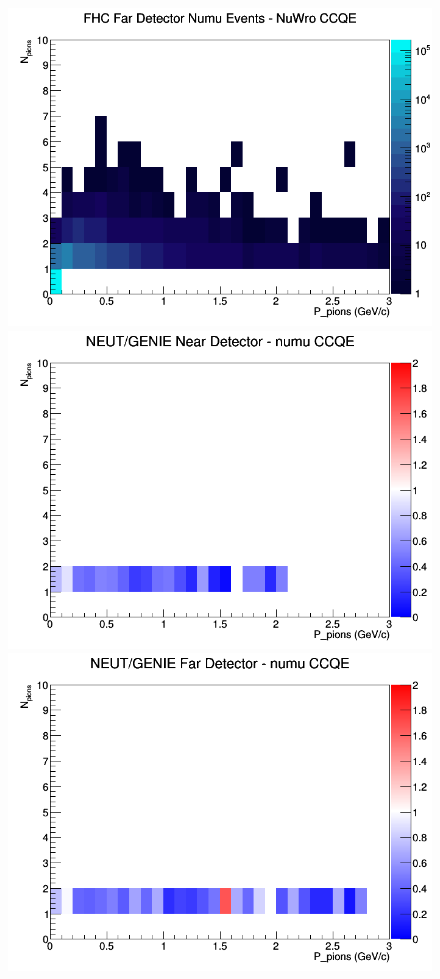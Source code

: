 \documentclass[12pt]{article}
\begin{document}
\begin{figure}[h]
\endminipage
{}
\includegraphics[width=\linewidth]{N_P/nominal/pions/CCQE_FHC_FD_numu_N_P_NuWro.png}
\endminipage
\newline
{}
\includegraphics[width=\linewidth]{N_P/nominal/pions/ratios/CCQE_NEUT_GENIE_numu_near_N_P.png}
\endminipage
{}
\includegraphics[width=\linewidth]{N_P/nominal/pions/ratios/CCQE_NEUT_GENIE_numu_far_N_P.png}

\end{figure}
\end{document}
